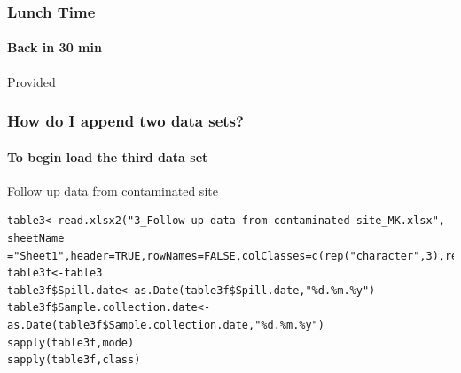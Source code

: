 \documentclass[10pt,handout,english]{beamer}\usepackage[]{graphicx}\usepackage[]{color}
\begin{document}
\begin{frame}
  \frametitle{Lunch Time}
  \framesubtitle{Back in 30 min}
  Provided
\end{frame}

\begin{frame}[fragile]
  \frametitle{How do I append two data sets?}
  \framesubtitle{To begin load the third data set}
  \begin{block}{Follow up data from contaminated site}

  \end{block}
\begin{lstlisting} 
table3<-read.xlsx2("3_Follow up data from contaminated site_MK.xlsx", sheetName ="Sheet1",header=TRUE,rowNames=FALSE,colClasses=c(rep("character",3),rep("character",2),rep("numeric",18)))
table3f<-table3
table3f$Spill.date<-as.Date(table3f$Spill.date,"%d.%m.%y")
table3f$Sample.collection.date<-as.Date(table3f$Sample.collection.date,"%d.%m.%y")
sapply(table3f,mode)
sapply(table3f,class)
\end{lstlisting}
  

\end{frame}
\end{document}
